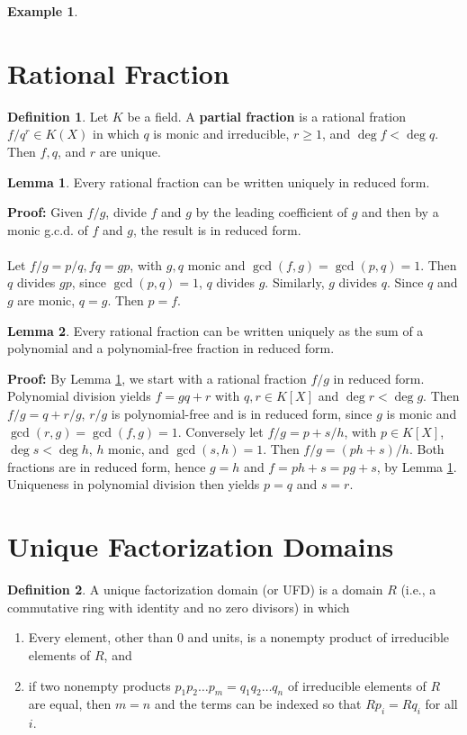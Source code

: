 \documentclass[11pt]{amsbook}%
\newcommand{\ii}{\item}
\theoremstyle{plain}
\theoremstyle{definition}
\newtheorem{definition*}{Definition}
\newtheorem*{example*}{Example}
\newtheorem{lemma}{Lemma}
\numberwithin{equation}{section}
\renewcommand{\proof}{ \textbf{Proof: }}
\DeclareMathOperator{\gcd}{gcd}
\begin{document}
\begin{example*}
\section{Rational Fraction}

\begin{definition*}
  Let $K$ be a field. A \textbf{partial fraction} is a rational fration $f/q^{r} \in K(X)$ in which
  $q$ is monic and irreducible, $r \geq 1$, and $\deg f < \deg q$. Then $f, q$, and
  $r$ are unique.
\end{definition*}

\begin{lemma}
  \label{lemm-rational-fraction}
  Every rational fraction can be written uniquely in reduced form.
\end{lemma} \vspace{1.8em}
\proof Given $f/g$, divide $f$ and $g$ by the leading coefficient of $g$ and then by
a monic g.c.d. of $f$ and $g$, the result is in reduced form. \\ \\
Let $f/g = p/q, fq = gp$, with $g, q$ monic and $\gcd(f, g) = \gcd(p, q) = 1$. Then $q$
divides $gp$, since $\gcd(p, q) = 1$, $q$ divides $g$. Similarly, $g$ divides $q$.
Since $q$ and $g$ are monic,  $q = g$. Then $p = f$. \qedsymbol

\begin{lemma}
  Every rational fraction can be written uniquely as the sum of a polynomial and
  a polynomial-free fraction in reduced form.
\end{lemma} \vspace{1.8em}
\proof By Lemma \ref{lemm-rational-fraction}, we start with a rational fraction $f/g$ in reduced form.
Polynomial division yields $f = gq + r$ with $q, r \in K[X]$ and $\deg r < \deg g$.
Then $f/g = q + r/g$, $r/g$ is polynomial-free and is in reduced form, since $g$ is monic and
$\gcd(r, g) = \gcd(f, g) = 1$. Conversely let $f/g = p + s/h$, with $p \in K[X]$, $\deg s < \deg h$,
$h$ monic, and $\gcd(s, h) = 1$. Then $f/g = (ph + s)/h$. Both fractions are in reduced form,
hence $g=h$ and $f = ph + s = pg + s$, by Lemma \ref{lemm-rational-fraction}. Uniqueness
in polynomial division then yields $p = q$ and $s = r$. \qedsymbol

\section{Unique Factorization Domains}
\begin{definition*}
  \label{def-ufd}
  A unique factorization domain (or UFD) is a domain $R$ (i.e., a commutative ring with identity
  and no zero divisors) in which
  \begin{enumerate}[1. ]
      \ii Every element, other than 0 and units, is a nonempty product of irreducible
      elements of $R$, and
      \ii if two nonempty products $p_{1}p_{2} \dots p_{m} = q_{1}q_{2} \dots q_{n}$ of irreducible elements
      of $R$ are equal, then $m = n$ and the terms can be indexed so that $Rp_{i} = Rq_{i}$
      for all $i$.
  \end{enumerate}
\end{definition*}


\end{example*}
\end{document}
